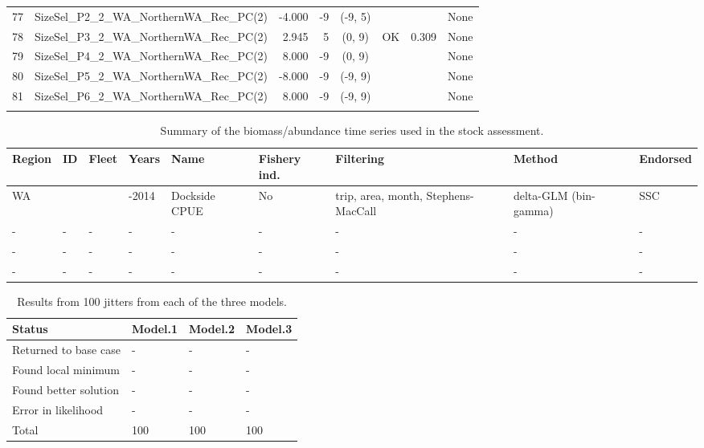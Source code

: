 \documentclass[12pt,]{article}
\begin{document}
\begin{landscape}
\begin{longtable}{rlrrcccl}
  77 & SizeSel\_P2\_2\_WA\_NorthernWA\_Rec\_PC(2) & -4.000 & -9 & (-9, 5) &  &  & None \\ 
  78 & SizeSel\_P3\_2\_WA\_NorthernWA\_Rec\_PC(2) & 2.945 & 5 & (0, 9) & OK & 0.309 & None \\ 
  79 & SizeSel\_P4\_2\_WA\_NorthernWA\_Rec\_PC(2) & 8.000 & -9 & (0, 9) &  &  & None \\ 
  80 & SizeSel\_P5\_2\_WA\_NorthernWA\_Rec\_PC(2) & -8.000 & -9 & (-9, 9) &  &  & None \\ 
  81 & SizeSel\_P6\_2\_WA\_NorthernWA\_Rec\_PC(2) & 8.000 & -9 & (-9, 9) &  &  & None \\ 
   \hline
\hline
\label{tab:model_params}
\end{longtable}
\end{landscape}

\newpage

\begin{table}[ht]
\centering
\caption{Summary of the biomass/abundance
                                              time series used in the stock
                                              assessment.} 
\label{tab:Index_summary}
\begin{tabular}{>{\centering}p{.4in}>{\centering}p{.3in}>{\centering}p{.3in}>{\centering}p{.3in}>{\centering}p{.6in}>{\centering}p{.5in}>{\centering}p{.8in}>{\centering}p{.8in}>{\centering}p{.5in}}
  \hline
Region & ID & Fleet & Years & Name & Fishery ind. & Filtering & Method & Endorsed \\ 
  \hline
WA & 1 & 4 & 1981-2014 & Dockside CPUE & No & trip, area, month, Stephens-MacCall & delta-GLM (bin-gamma) & SSC \\ 
  - & - & - & - & - & - & - & - & - \\ 
  - & - & - & - & - & - & - & - & - \\ 
  - & - & - & - & - & - & - & - & - \\ 
   \hline
\end{tabular}
\end{table}

\newpage

\begin{table}[ht]
\centering
\caption{Results from 100 jitters from each of 
                                      the three models.} 
\label{tab:jitter}
\begin{tabular}{llll}
  \hline
Status & Model.1 & Model.2 & Model.3 \\ 
  \hline
Returned to base case & - & - & - \\ 
  Found local minimum & - & - & - \\ 
  Found better solution & - & - & - \\ 
  Error in likelihood & - & - & - \\ 
  Total & 100 & 100 & 100 \\ 
   \hline
\end{tabular}
\end{table}
\end{document}
